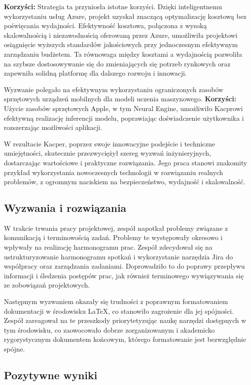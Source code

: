 \documentclass[12pt, a4paper, twoside, openany]{book}
\newcommand{\forceindent}{\leavevmode{\parindent=1.3em\indent}}
\begin{document}
{\textbf{Korzyści:} Strategia ta przyniosła istotne korzyści. Dzięki inteligentnemu wykorzystaniu usług Azure, projekt uzyskał znaczącą optymalizację kosztową bez poświęcania wydajności. Efektywność kosztowa, połączona z wysoką skalowalnością i niezawodnością oferowaną przez Azure, umożliwiła projektowi osiągnięcie wyższych standardów jakościowych przy jednoczesnym efektywnym zarządzaniu budżetem. Ta równowaga między kosztami a wydajnością pozwoliła na szybsze dostosowywanie się do zmieniających się potrzeb rynkowych oraz zapewniła solidną platformę dla dalszego rozwoju i innowacji.

Wyzwanie polegało na efektywnym wykorzystaniu ograniczonych zasobów sprzętowych urządzeń mobilnych dla modeli uczenia maszynowego. 
\textbf{Korzyści:} Użycie zasobów sprzętowych Apple, w tym Neural Engine, umożliwiło Kacprowi efektywną realizację inferencji modelu, poprawiając doświadczenie użytkownika i rozszerzając możliwości aplikacji.

W rezultacie Kacper, poprzez swoje innowacyjne podejście i techniczne umiejętności, skutecznie przezwyciężył szereg wyzwań inżynieryjnych, dostarczając wartościowe i praktyczne rozwiązania. Jego praca stanowi znakomity przykład wykorzystania nowoczesnych technologii w rozwiązaniu realnych problemów, z ogromnym naciskiem na bezpieczeństwo, wydajność i skalowalność.

\subsection{Wyzwania i rozwiązania}

\forceindent W trakcie trwania pracy projektowej, zespół napotkał problemy związane z komunikacją i terminowością zadań. Problemy te występowały okresowo i wpływały na realizację harmonogramu prac. Zespół zdecydował się na ustrukturyzowanie harmonogramu spotkań i wykorzystanie narzędzia Jira do współpracy oraz zarządzania zadaniami. Doprowadziło to do poprawy przepływu informacji i śledzenia postępów prac, jak również terminowego wywiązywania się ze zobowiązań projektowych.

Następnym wyzwaniem okazały się trudności z poprawnym formatowaniem dokumentacji w środowisku LaTeX, co stanowiło zagrożenie dla jej spójności. Zespół zareagował na te przeszkody priorytetyzując naukę narzędzi dostępnych w tym środowisku, co zaowocowało dobrze zorganizowanym i akademicko rygorystycznym dokumentem końcowym, którego formatowanie jest bezwzględnie spójne.

\subsection{Pozytywne wyniki}

}
\end{document}

